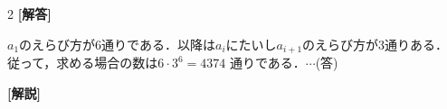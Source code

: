 \documentclass[../../main.tex]{subfiles}
\begin{document}
\setcounter{equation}{0}
\begin{oframed}
  
\end{oframed}
\setlength{\columnseprule}{0.4pt}
\begin{multicols}{2}
  {\bf [解答]}

  $a_1$のえらび方が$6$通りである．以降は$a_{i}$にたいし$a_{i+1}$のえらび方が$3$通りある．
  従って，求める場合の数は$6 \cdot 3^6 = 4374$ 通りである．$\cdots$(答)

  {\bf [解説]}

  \newpage
\end{multicols}
\end{document}
